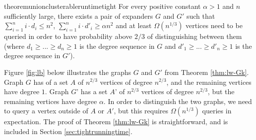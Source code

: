 \documentclass[letterpaper,11pt]{article}
\theoremstyle{plain}
\theoremstyle{definition}
\theoremstyle{remark}
\begin{document}
\begin{restatable}{theorem}{unionclusterableruntimetight}
	\label{thm:lw-Gk}
	For every positive constant $\alpha>1$ and $n$ sufficiently large, there exists a pair of expanders $G$ and $G'$ such that $\sum_{i=1}^n i \cdot d_i  \leq  n^2$, $\sum_{i=1}^n i \cdot d'_i \geq \alpha n^2$ and at least $\Omega(n^{1/3})$ vertices need to be queried in order to have probability above $2/3$ of distinguishing between them (where $d_1  \geq ... \geq d_n \geq 1$ is the degree sequence in $G$ and $d'_1 \geq ...\geq  d'_n \geq 1$ is the degree sequence in $G'$). 
\end{restatable}
Figure \ref{fig:lb} below illustrates the graphs $G$ and $G'$ from Theorem \ref{thm:lw-Gk}. Graph $G$ has of a set $A$ of $n^{2/3}$ vertices of degree $n^{2/3}$, and the remaining vertices have degree $1$. Graph $G’$ has a set $A’$ of $n^{2/3}$ vertices of degree $n^{2/3}$, but the remaining vertices have degree $\alpha$. In order to distinguish the two graphs, we need to query a vertex outside of $A$ or $A'$, but this requires  $\Omega(n^{1/3})$ queries in expectation. The proof of Theorem \ref{thm:lw-Gk} is straightforward, and is included in Section \ref{sec:tightrunningtime}. 
\end{document}
